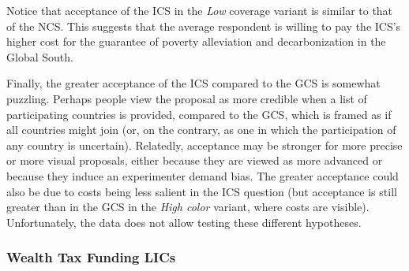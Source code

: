 \documentclass[12pt,english]{article}
\begin{document}
\begin{bibunit}
Notice that acceptance of the ICS in the \textit{Low} coverage variant is similar to that of the NCS. This suggests that the average respondent is willing to pay the ICS's higher cost for the guarantee of poverty alleviation and decarbonization in the Global South. %

Finally, the greater acceptance of the ICS compared to the GCS is somewhat puzzling. Perhaps people view the proposal as more credible when a list of participating countries is provided, compared to the GCS, which is framed as if all countries might join (or, on the contrary, as one in which the participation of any country is uncertain). Relatedly, acceptance may be stronger for more precise or more visual proposals, either because they are viewed as more advanced or because they induce an experimenter demand bias. The greater acceptance could also be due to costs being less salient in the ICS question (but acceptance is still greater than in the GCS in the \textit{High color} variant, where costs are visible). Unfortunately, the data does not allow testing these different hypotheses. %


\subsubsection{Wealth Tax Funding LICs}\label{subsec:wealth_tax}


\end{bibunit}
\end{document}

